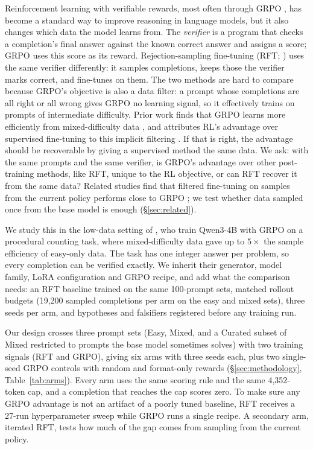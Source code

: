 \documentclass{article}
\begin{document}
Reinforcement learning with verifiable rewards, most often through GRPO \citep{shao2024deepseekmath}, has become a standard way to improve reasoning in language models, but it also changes which data the model learns from. The \emph{verifier} is a program that checks a completion's final answer against the known correct answer and assigns a score; GRPO uses this score as its reward. Rejection-sampling fine-tuning (RFT; \citealp{yuan2023scaling}) uses the same verifier differently: it samples completions, keeps those the verifier marks correct, and fine-tunes on them. The two methods are hard to compare because GRPO's objective is also a data filter: a prompt whose completions are all right or all wrong gives GRPO no learning signal, so it effectively trains on prompts of intermediate difficulty. Prior work finds that GRPO learns more efficiently from mixed-difficulty data \citep{bauer2026}, and attributes RL's advantage over supervised fine-tuning to this implicit filtering \citep{lu2026why}. If that is right, the advantage should be recoverable by giving a supervised method the same data. We ask: with the same prompts and the same verifier, is GRPO's advantage over other post-training methods, like RFT, unique to the RL objective, or can RFT recover it from the same data? Related studies find that filtered fine-tuning on samples from the current policy performs close to GRPO \citep{xiong2025minimalist,samineni2025rl}; we test whether data sampled once from the base model is enough (\S\ref{sec:related}).

We study this in the low-data setting of \citet{bauer2026}, who train Qwen3-4B with GRPO on a procedural counting task, where mixed-difficulty data gave up to $5\times$ the sample efficiency of easy-only data. The task has one integer answer per problem, so every completion can be verified exactly. We inherit their generator, model family, LoRA configuration and GRPO recipe, and add what the comparison needs: an RFT baseline trained on the same 100-prompt sets, matched rollout budgets (19{,}200 sampled completions per arm on the easy and mixed sets), three seeds per arm, and hypotheses and falsifiers registered before any training run.

Our design crosses three prompt sets (Easy, Mixed, and a Curated subset of Mixed restricted to prompts the base model sometimes solves) with two training signals (RFT and GRPO), giving six arms with three seeds each, plus two single-seed GRPO controls with random and format-only rewards (\S\ref{sec:methodology}, Table~\ref{tab:arms}). Every arm uses the same scoring rule and the same 4{,}352-token cap, and a completion that reaches the cap scores zero. To make sure any GRPO advantage is not an artifact of a poorly tuned baseline, RFT receives a 27-run hyperparameter sweep while GRPO runs a single recipe. A secondary arm, iterated RFT, tests how much of the gap comes from sampling from the current policy.
\end{document}
